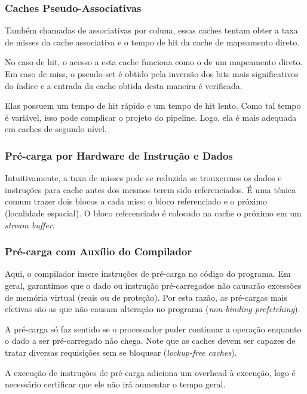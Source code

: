 \subsubsection{Caches Pseudo-Associativas}
Também chamadas de associativas por coluna, essas caches tentam obter a taxa de misses da cache associativa e o tempo de hit da cache de mapeamento direto.

No caso de hit, o acesso a esta cache funciona como o de um mapeamento direto. Em caso de miss, o pseudo-set é obtido pela inversão dos bits mais significativos do índice e a entrada da cache obtida desta maneira é verificada.

Elas possuem um tempo de hit rápido e um tempo de hit lento. Como tal tempo é variável, isso pode complicar o projeto do pipeline. Logo, ela é mais adequada em caches de segundo nível.



\subsubsection{Pré-carga por Hardware de Instrução e Dados}
Intuitivamente, a taxa de misses pode se reduzida se trouxermos os dados e instruções para cache antes dos mesmos terem sido referenciados. É uma ténica comum trazer dois blocos a cada miss: o bloco referenciado e o próximo (localidade espacial). O bloco referenciado é colocado na cache o próximo em um \textit{stream buffer}.



\subsubsection{Pré-carga com Auxílio do Compilador}
Aqui, o compilador insere instruções de pré-carga no código do programa. Em geral, garantimos que o dado ou instrução pré-carregados não causarão excessões de memória virtual (reais ou de proteção). Por esta razão, as pré-cargas mais efetivas são as que não causam alteração no programa (\textit{non-binding prefetching}).

A pré-carga só faz sentido se o processador puder continuar a operação enquanto o dado a ser pré-carregado não chega. Note que as caches devem ser capazes de tratar diversas requisições sem se bloquear (\textit{lockup-free caches}).

A execução de instruções de pré-carga adiciona um overhead à execução, logo é necessário certificar que ele não irá aumentar o tempo geral.



